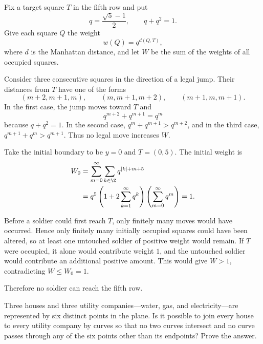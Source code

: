     \begin{solution}
        Fix a target square $T$ in the fifth row and put
        \[
            q=\frac{\sqrt5-1}{2},
            \qquad
            q+q^2=1.
        \]
        Give each square $Q$ the weight
        \[
            w(Q)=q^{d(Q,T)},
        \]
        where $d$ is the Manhattan distance, and let $W$ be the sum of the
        weights of all occupied squares.

        Consider three consecutive squares in the direction of a legal jump.
        Their distances from $T$ have one of the forms
        \[
            (m+2,m+1,m),
            \qquad
            (m,m+1,m+2),
            \qquad
            (m+1,m,m+1).
        \]
        In the first case, the jump moves toward $T$ and
        \[
            q^{m+2}+q^{m+1}=q^m
        \]
        because $q+q^2=1$. In the second case,
        $q^m+q^{m+1}>q^{m+2}$, and in the third case,
        $q^{m+1}+q^m>q^{m+1}$. Thus no legal move increases $W$.

        Take the initial boundary to be $y=0$ and $T=(0,5)$. The initial weight
        is
        \[
            \begin{aligned}
                W_0
                &=
                \sum_{m=0}^{\infty}\sum_{k\in\Z}q^{|k|+m+5}\\
                &=
                q^5
                \left(1+2\sum_{k=1}^{\infty}q^k\right)
                \left(\sum_{m=0}^{\infty}q^m\right)
                =1.
            \end{aligned}
        \]

        Before a soldier could first reach $T$, only finitely many moves would
        have occurred. Hence only finitely many initially occupied squares
        could have been altered, so at least one untouched soldier of positive
        weight would remain. If $T$ were occupied, it alone would contribute
        weight $1$, and the untouched soldier would contribute an additional
        positive amount. This would give $W>1$, contradicting $W\leq W_0=1$.

        Therefore no soldier can reach the fifth row.
    \end{solution}

    \begin{expectedproblem}
        Three houses and three utility companies---water, gas, and
        electricity---are represented by six distinct points in the plane. Is
        it possible to join every house to every utility company by curves so
        that no two curves intersect and no curve passes through any of the six
        points other than its endpoints? Prove the answer.
    \end{expectedproblem}

